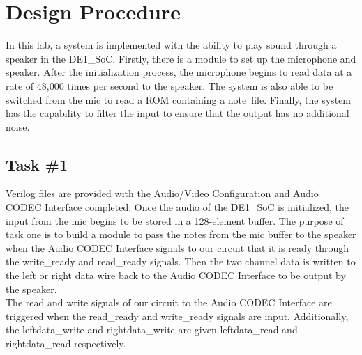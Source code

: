 \documentclass[11pt, titlepage]{article}
\author{Cameron Jennings (ID: 2029631), Donovan Clay (ID: 2276005)}
\title{\assignmentname}
\date{\parbox{\linewidth}{\centering
\experimentDate
  \endgraf\bigskip
  \className\
}}
\begin{document}
	\maketitle
 
    \setcounter{tocdepth}{2}
    \begin{center}
        \tableofcontents\label{beginning}
    \end{center}
    \newpage
    
    \section{Design Procedure}
        In this lab, a system is implemented with the ability to play sound through a speaker in the DE1\_SoC. Firstly, there is a module to set up the microphone and speaker. After the initialization process, the microphone begins to read data at a rate of 48,000 times per second to the speaker. The system is also able to be switched from the mic to read a ROM containing a note\ file. Finally, the system has the capability to filter the input to ensure that the output has no additional noise.
    
        \subsection{Task \#1}
            Verilog files are provided with the Audio/Video Configuration and Audio CODEC Interface completed. Once the audio of the DE1\_SoC is initialized, the input from the mic begins to be stored in a 128-element buffer. The purpose of task one is to build a module to pass the notes from the mic buffer to the speaker when the Audio CODEC Interface signals to our circuit that it is ready through the write\_ready and read\_ready signals. Then the two channel data is written to the left or right data wire back to the Audio CODEC Interface to be output by the speaker. \\

            The read and write signals of our circuit to the Audio CODEC Interface are triggered when the read\_ready and write\_ready signals are input. Additionally, the leftdata\_write and rightdata\_write are given leftdata\_read and rightdata\_read respectively.
\end{document}
